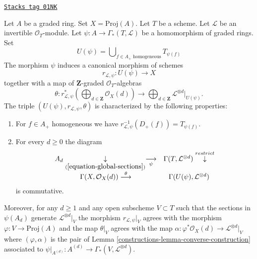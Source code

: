 \begin{lemma}
\label{constructions-lemma-invertible-map-into-proj}
\href{https://stacks.math.columbia.edu/tag/01NK}{\texttt{Stacks tag 01NK}}

Let $A$ be a graded ring.
Set $X = \text{Proj}(A)$.
Let $T$ be a scheme.
Let $\mathcal{L}$ be an invertible $\mathcal{O}_T$-module.
Let $\psi : A \to \Gamma_*(T, \mathcal{L})$ be a homomorphism
of graded rings. Set
$$
U(\psi) = \bigcup\nolimits_{f \in A_{+}\text{ homogeneous}} T_{\psi(f)}
$$
The morphism $\psi$ induces a canonical morphism of schemes
$$
r_{\mathcal{L}, \psi} :
U(\psi) \longrightarrow X
$$
together with a map of $\mathbf{Z}$-graded $\mathcal{O}_T$-algebras
$$
\theta :
r_{\mathcal{L}, \psi}^*\left(
\bigoplus\nolimits_{d \in \mathbf{Z}} \mathcal{O}_X(d)
\right)
\longrightarrow
\bigoplus\nolimits_{d \in \mathbf{Z}} \mathcal{L}^{\otimes d}|_{U(\psi)}.
$$
The triple $(U(\psi), r_{\mathcal{L}, \psi}, \theta)$ is
characterized by the following properties:
\begin{enumerate}
\item For $f \in A_{+}$ homogeneous we have
$r_{\mathcal{L}, \psi}^{-1}(D_{+}(f)) = T_{\psi(f)}$.
\item For every $d \geq 0$ the diagram
$$
\begin{array}{cc}A_d \underset{(\ref{equation-global-sections})}{\downarrow}\underset{\psi}{\longrightarrow} & \Gamma(T, \mathcal{L}^{\otimes d}) \overset{restrict}{\downarrow} \\ \Gamma(X, \mathcal{O}_X(d)) \overset{\theta}{\longrightarrow} & \Gamma(U(\psi), \mathcal{L}^{\otimes d})\end{array}
$$
is commutative.
\end{enumerate}
Moreover, for any $d \geq 1$ and any open subscheme $V \subset T$
such that the sections in $\psi(A_d)$ generate $\mathcal{L}^{\otimes d}|_V$
the morphism $r_{\mathcal{L}, \psi}|_V$ agrees with the morphism
$\varphi : V \to \text{Proj}(A)$ and the map $\theta|_V$ agrees with the map
$\alpha : \varphi^*\mathcal{O}_X(d) \to \mathcal{L}^{\otimes d}|_V$
where $(\varphi, \alpha)$ is the pair
of Lemma \ref{constructions-lemma-converse-construction}
associated to
$\psi|_{A^{(d)}} : A^{(d)} \to \Gamma_*(V, \mathcal{L}^{\otimes d})$.
\end{lemma}

